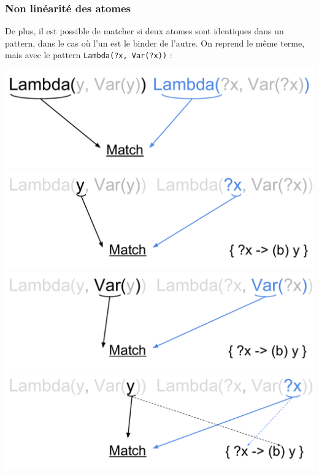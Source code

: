 \begin{frame}
\begin{center}
\end{center}

\end{frame}

\begin{frame}
\frametitle{Non linéarité des atomes}

De plus, il est possible de matcher si deux atomes sont identiques dans un
pattern, dans le cas où l'un est le binder de l'autre. On reprend le même terme,
mais avec le pattern \texttt{Lambda(?x, Var(?x))} :

\bigskip
\begin{center}
      {\includegraphics[scale=0.5]{pattern/atom1.pdf}}
      {\includegraphics[scale=0.5]{pattern/atom2.pdf}}
      {\includegraphics[scale=0.5]{pattern/atom3.pdf}}
      {\includegraphics[scale=0.5]{pattern/atom4.pdf}}

\end{center}
\end{frame}
